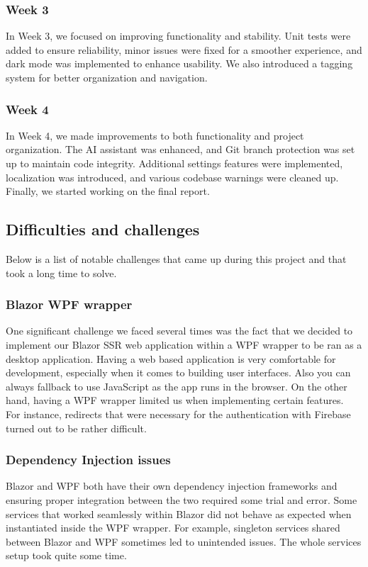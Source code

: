 \documentclass{article}
\begin{document}
\subsubsection{Week 3}
In Week 3, we focused on improving functionality and stability.
Unit tests were added to ensure reliability, minor issues were fixed for a smoother experience, and dark mode was implemented to enhance usability.
We also introduced a tagging system for better organization and navigation.

\subsubsection{Week 4}
In Week 4, we made improvements to both functionality and project organization.
The AI assistant was enhanced, and Git branch protection was set up to maintain code integrity.
Additional settings features were implemented, localization was introduced, and various codebase warnings were cleaned up.
Finally, we started working on the final report.

\subsection{Difficulties and challenges}
Below is a list of notable challenges that came up during this project and that took a long time to solve.

\subsubsection{Blazor WPF wrapper}
One significant challenge we faced several times was the fact that we decided to implement our Blazor SSR web application within a WPF wrapper to be ran as a desktop application.
Having a web based application is very comfortable for development, especially when it comes to building user interfaces. Also you can always fallback to use JavaScript as the app runs in the browser.
On the other hand, having a WPF wrapper limited us when implementing certain features.\\
For instance, redirects that were necessary for the authentication with Firebase turned out to be rather difficult.

\subsubsection{Dependency Injection issues}
Blazor and WPF both have their own dependency injection frameworks and ensuring proper integration between the two required some trial and error.
Some services that worked seamlessly within Blazor did not behave as expected when instantiated inside the WPF wrapper.
For example, singleton services shared between Blazor and WPF sometimes led to unintended issues.
The whole services setup took quite some time.
\end{document}
